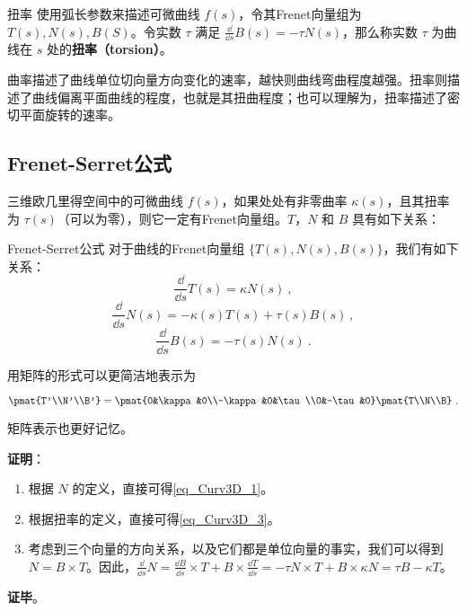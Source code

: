 \begin{definition}{扭率}
使用弧长参数来描述可微曲线 $f(s)$，令其Frenet向量组为 $T(s), N(s), B(S)$。令实数 $\tau$ 满足 $\frac{\dd}{\dd s}B(s)=-\tau N(s)$，那么称实数 $\tau$ 为曲线在 $s$ 处的\textbf{扭率（torsion）}。
\end{definition}

曲率描述了曲线单位切向量方向变化的速率，越快则曲线弯曲程度越强。扭率则描述了曲线偏离平面曲线的程度，也就是其扭曲程度；也可以理解为，扭率描述了密切平面旋转的速率。

\subsection{Frenet-Serret公式}

三维欧几里得空间中的可微曲线 $f(s)$，如果处处有非零曲率 $\kappa(s)$，且其扭率为 $\tau(s)$（可以为零），则它一定有Frenet向量组。$T$，$N$ 和 $B$ 具有如下关系：

\begin{theorem}{Frenet-Serret公式}
对于曲线的Frenet向量组 $\{T(s), N(s), B(s)\}$，我们有如下关系：
\begin{equation}\label{eq_Curv3D_1}
\frac{\dd}{\dd s}T(s)=\kappa N(s)~,
\end{equation}
\begin{equation}\label{eq_Curv3D_2}
\frac{\dd}{\dd s}N(s)=-\kappa(s) T(s)+\tau(s) B(s)~,
\end{equation}
\begin{equation}\label{eq_Curv3D_3}
\frac{\dd}{\dd s}B(s)=-\tau(s) N(s)~.
\end{equation}

用矩阵的形式可以更简洁地表示为

\begin{equation}
\pmat{T'\\N'\\B'}=\pmat{0&\kappa&0\\-\kappa&0&\tau\\0&-\tau&0}\pmat{T\\N\\B}~.
\end{equation}

矩阵表示也更好记忆。
\end{theorem}

\textbf{证明}：

\begin{enumerate}
\item 根据 $N$ 的定义，直接可得\autoref{eq_Curv3D_1}。
\item 根据扭率的定义，直接可得\autoref{eq_Curv3D_3}。
\item 考虑到三个向量的方向关系，以及它们都是单位向量的事实，我们可以得到 $N=B\times T$。因此，$\frac{\dd}{\dd s}N=\frac{\dd B}{\dd s}\times T+B\times\frac{\dd T}{\dd s}=-\tau N\times T+B\times\kappa N=\tau B-\kappa T$。
\end{enumerate}

\textbf{证毕}。





